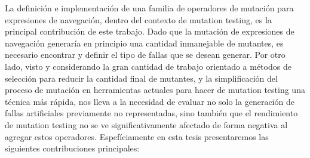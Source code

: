 
La definici\'on e implementaci\'on de una familia de operadores de mutaci\'on para expresiones de navegaci\'on, dentro del contexto de mutation testing, es la principal contribuci\'on de este trabajo. Dado que la mutaci\'on de expresiones de navegaci\'on generar\'ia en principio una cantidad inmanejable de mutantes, es necesario encontrar y definir el tipo de fallas que se desean generar. Por otro lado, visto y considerando la gran cantidad de trabajo orientado a m\'etodos de selecci\'on para reducir la cantidad final de mutantes, y la simplificaci\'on del proceso de mutaci\'on en herramientas actuales para hacer de mutation testing una t\'ecnica m\'as r\'apida, nos lleva a la necesidad de evaluar no solo la generaci\'on de fallas artificiales previamente no representadas, sino tambi\'en que el rendimiento de mutation testing no se ve significativamente afectado de forma negativa al agregar estos operadores. Espef\'iciamente en esta tesis presentaremos las siguientes contribuciones principales:


